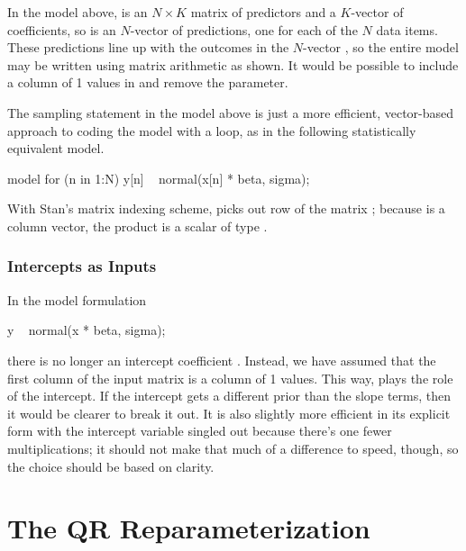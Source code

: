 In the model above,  is an $N \times K$ matrix of predictors
and  a $K$-vector of coefficients, so  is an
$N$-vector of predictions, one for each of the $N$ data items.  These
predictions line up with the outcomes in the $N$-vector , so
the entire model may be written using matrix arithmetic as shown.  It
would be possible to include a column of 1 values in  and
remove the  parameter.

The sampling statement in the model above is just a more efficient,
vector-based approach to coding the model with a loop, as in the
following statistically equivalent model.
%
\begin{stancode}
model {
  for (n in 1:N)
    y[n] ~ normal(x[n] * beta, sigma);
}
\end{stancode}
%
With Stan's matrix indexing scheme,  picks out row 
of the matrix ;  because  is a column vector,
the product  is a scalar of type .

\subsubsection{Intercepts as Inputs}

In the model formulation
%
\begin{stancode}
  y ~ normal(x * beta, sigma);
\end{stancode}
%
there is no longer an intercept coefficient .  Instead, we
have assumed that the first column of the input matrix  is a
column of 1 values.  This way,  plays the role of the
intercept.  If the intercept gets a different prior than the slope
terms, then it would be clearer to break it out.  It is also slightly
more efficient in its explicit form with the intercept variable
singled out because there's one fewer multiplications; it should not
make that much of a difference to speed, though, so the choice should
be based on clarity.

\section{The QR Reparameterization}\label{QR-reparameterization.section}

